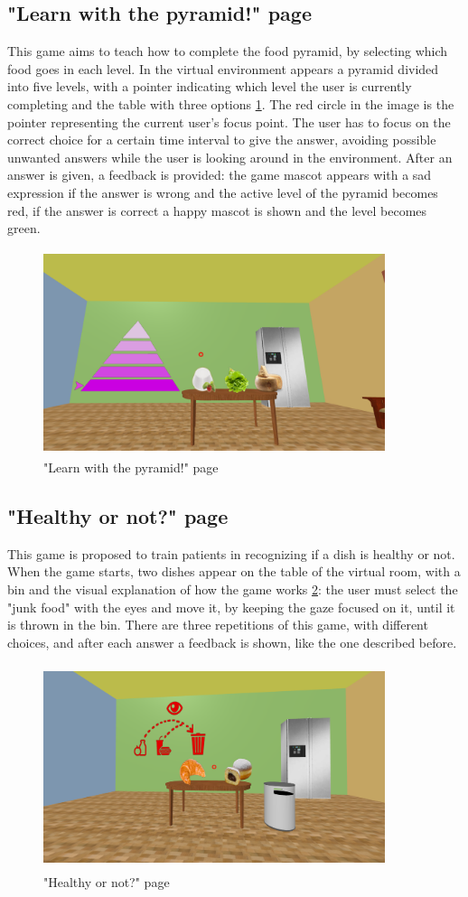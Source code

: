 \subsection{"Learn with the pyramid!" page}
This game aims to teach how to complete the food pyramid, by selecting which food goes in each level. In the virtual environment appears a pyramid divided into five levels, with a pointer indicating which level the user is currently completing and the table with three options \ref{fig:pyramid}. The red circle in the image is the pointer representing the current user's focus point. The user has to focus on the correct choice for a certain time interval to give the answer, avoiding possible unwanted answers while the user is looking around in the environment. After an answer is given, a feedback is provided: the game mascot appears with a sad expression if the answer is wrong and the active level of the pyramid becomes red, if the answer is correct a happy mascot is shown and the level becomes green.
\begin{figure}[H]
\centering
\includegraphics[width=10cm, height=6cm]{immagini/Pyramid.png}
\caption{"Learn with the pyramid!" page}\label{fig:pyramid}
\end{figure}
\subsection{"Healthy or not?" page}
This game is proposed to train patients in recognizing if a dish is healthy or not. When the game starts, two dishes appear on the table of the virtual room, with a bin and the visual explanation of how the game works \ref{fig:healthy}: the user must select the "junk food" with the eyes and move it, by keeping the gaze focused on it, until it is thrown in the bin. There are three repetitions of this game, with different choices, and after each answer a feedback is shown, like the one described before.
\begin{figure}[H]
\centering
\includegraphics[width=10cm, height=6cm]{immagini/Healthy.png}
\caption{"Healthy or not?" page}\label{fig:healthy}
\end{figure}
